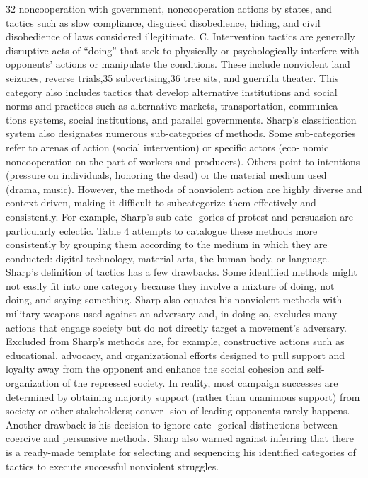 \documentclass[twoside,a4paper,12pt,fleqn,openany]{extbook}
\begin{document}
32
noncooperation with government, noncooperation actions by states, and tactics such
as slow compliance, disguised disobedience, hiding, and civil disobedience of laws
considered illegitimate.
C.	 Intervention tactics are generally disruptive acts of “doing” that seek to physically or
psychologically interfere with opponents’ actions or manipulate the conditions. These
include nonviolent land seizures, reverse trials,35 subvertising,36 tree sits, and guerrilla
theater. This category also includes tactics that develop alternative institutions and
social norms and practices such as alternative markets, transportation, communica-
tions systems, social institutions, and parallel governments.
Sharp’s classification system also designates numerous sub-categories of methods.
Some sub-categories refer to arenas of action (social intervention) or specific actors (eco-
nomic noncooperation on the part of workers and producers). Others point to intentions
(pressure on individuals, honoring the dead) or the material medium used (drama, music).
However, the methods of nonviolent action are highly diverse and context-driven, making it
difficult to subcategorize them effectively and consistently. For example, Sharp’s sub-cate-
gories of protest and persuasion are particularly eclectic. Table 4 attempts to catalogue these
methods more consistently by grouping them according to the medium in which they are
conducted: digital technology, material arts, the human body, or language.
Sharp’s definition of tactics has a few drawbacks. Some identified methods might not
easily fit into one category because they involve a mixture of doing, not doing, and saying
something. Sharp also equates his nonviolent methods with military weapons used against
an adversary and, in doing so, excludes many actions that engage society but do not directly
target a movement’s adversary. Excluded from Sharp’s methods are, for example, constructive
actions such as educational, advocacy, and organizational efforts designed to pull support
and loyalty away from the opponent and enhance the social cohesion and self-organization
of the repressed society. In reality, most campaign successes are determined by obtaining
majority support (rather than unanimous support) from society or other stakeholders; conver-
sion of leading opponents rarely happens. Another drawback is his decision to ignore cate-
gorical distinctions between coercive and persuasive methods.
Sharp also warned against inferring that there is a ready-made template for selecting
and sequencing his identified categories of tactics to execute successful nonviolent struggles.
\end{document}
